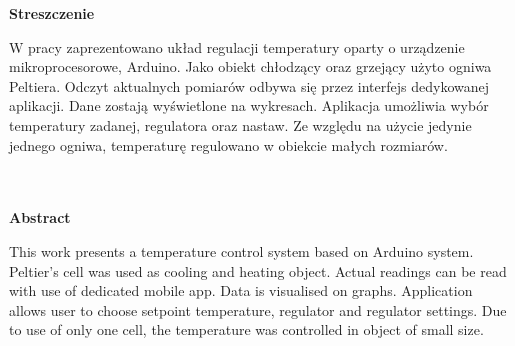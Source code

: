 \vspace*{\fill}
\begin{center}
{\centering \Huge \bfseries Streszczenie}\\
\end{center}
W pracy zaprezentowano układ regulacji temperatury oparty o urządzenie mikroprocesorowe, Arduino. Jako obiekt chłodzący oraz grzejący użyto ogniwa Peltiera. Odczyt aktualnych pomiarów odbywa się przez interfejs dedykowanej aplikacji. Dane zostają wyświetlone na wykresach.  Aplikacja umożliwia wybór temperatury zadanej, regulatora oraz nastaw. Ze względu na użycie jedynie jednego ogniwa, temperaturę regulowano w obiekcie małych rozmiarów.
\\
\\
\\
\begin{center}
 {\Huge \bfseries  Abstract}\\
\end{center}
This work presents a temperature control system based on Arduino system. Peltier's cell was used as cooling and heating object. Actual readings can be read with use of dedicated mobile app. Data is visualised on graphs. Application allows user to choose setpoint temperature, regulator and regulator settings. Due to use of only one cell, the temperature was controlled in object of small size.
\\
\\
\\
\\
\\
\\
\\
\\
\\
\vspace*{\fill}